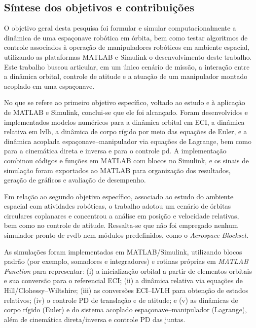 \subsection{Síntese dos objetivos e contribuições}
\label{sec:cap5_sintese_obj_contrib}

O objetivo geral desta pesquisa foi formular e simular computacionalmente a dinâmica de uma espaçonave robótica em órbita, bem como testar algoritmos de controle associados à operação de manipuladores robóticos em ambiente espacial, utilizando as plataformas MATLAB e Simulink o desenvolvimento deste trabalho.
Este trabalho buscou articular, em um único cenário de missão, a interação entre a dinâmica orbital, controle de atitude e a atuação de um manipulador montado acoplado em uma espaçonave.


No que se refere ao primeiro objetivo específico, voltado ao estudo e à aplicação de MATLAB e Simulink, conclui-se que ele foi alcançado.
Foram desenvolvidos e implementados modelos numéricos para a dinâmica orbital em ECI, a dinâmica relativa em \gls{lvlh}, a dinâmica de corpo rígido por meio das equações de Euler, e a dinâmica acoplada espaçonave--manipulador via equações de Lagrange, bem como para a cinemática direta e inversa e para o controle \gls{pd}.
A implementação combinou códigos e funções em MATLAB com blocos no Simulink, e os sinais de simulação foram exportados ao MATLAB para organização dos resultados, geração de gráficos e avaliação de desempenho.


Em relação ao segundo objetivo específico, associado ao estudo do ambiente espacial com atividades robóticas, o trabalho adotou um cenário de órbitas circulares coplanares e concentrou a análise em posição e velocidade relativas, bem como no controle de atitude.
Ressalta-se que não foi empregado nenhum simulador pronto de \gls{rvdb} nem módulos predefinidos, como o \emph{Aerospace Blockset}.

As simulações foram implementadas em MATLAB/Simulink, utilizando blocos padrão (por exemplo, somadores e integradores) e rotinas próprias em \emph{MATLAB Function} para representar:
(i) a inicialização orbital a partir de elementos orbitais e sua conversão para o referencial ECI;
(ii) a dinâmica relativa via equações de Hill/Clohessy--Wiltshire;
(iii) as conversões ECI--LVLH para obtenção de estados relativos;
(iv) o controle PD de translação e de atitude; e
(v) as dinâmicas de corpo rígido (Euler) e do sistema acoplado espaçonave--manipulador (Lagrange), além de cinemática direta/inversa e controle PD das juntas.

